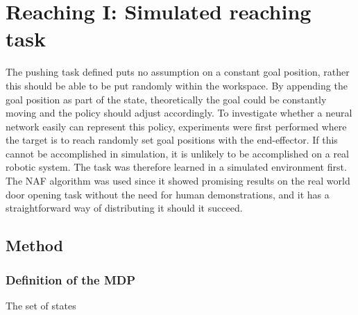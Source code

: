 \chapter{Reaching I: Simulated reaching task}

The pushing task defined puts no assumption on a constant goal position, rather
this should be able to be put randomly within the workspace. By appending the
goal position as part of the state, theoretically the goal could be constantly
moving and the policy should adjust accordingly. To investigate whether a
neural network easily can represent this policy, experiments were first
performed where the target is to reach randomly set goal positions with the
end-effector. If this cannot be accomplished in simulation, it is unlikely to
be accomplished on a real robotic system. The task was therefore learned in a
simulated environment first. The NAF algorithm was used since it showed
promising results on the real world door opening task without the need for
human demonstrations, and it has a straightforward way of distributing it
should it succeed.

\section{Method}

\subsection{Definition of the MDP}

The set of states

